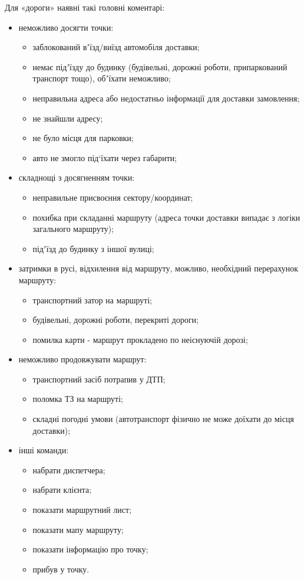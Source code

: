 Для «дороги» наявні такі головні коментарі:
\begin{itemize}
	\item неможливо досягти точки:
	\begin{itemize}
		\item заблокований вʼїзд/виїзд автомобіля доставки;
		\item немає підʼїзду до будинку (будівельні, дорожні роботи, припаркований транспорт тощо), обʼїхати неможливо;
		\item неправильна адреса або недостатньо інформації для доставки замовлення;
		\item не знайшли адресу;
		\item не було місця для парковки;
		\item авто не змогло під`їхати через габарити;
	\end{itemize}
	\item складнощі з досягненням точки:
	\begin{itemize}
		\item неправильне присвоєння сектору/координат;
		\item похибка при складанні маршруту (адреса точки доставки випадає з логіки загального маршруту);
		\item підʼїзд до будинку з іншої вулиці;
	\end{itemize}
	\item затримки в русі, відхилення від маршруту, можливо, необхідний перерахунок маршруту:
	\begin{itemize}
		\item транспортний затор на маршруті;
		\item будівельні, дорожні роботи, перекриті дороги;
		\item помилка карти - маршрут прокладено по неіснуючій дорозі;
	\end{itemize}
	\item неможливо продовжувати маршрут:
	\begin{itemize}
		\item транспортний засіб потрапив у ДТП;
		\item поломка ТЗ на маршруті;
		\item складні погодні умови (автотранспорт фізично не може доїхати до місця доставки);
	\end{itemize}
	\item інші команди:
	\begin{itemize}
		\item набрати диспетчера;
		\item набрати клієнта;
		\item показати маршрутний лист;
		\item показати мапу маршруту;
		\item показати інформацію про точку;
		\item прибув у точку.
	\end{itemize}
\end{itemize}

